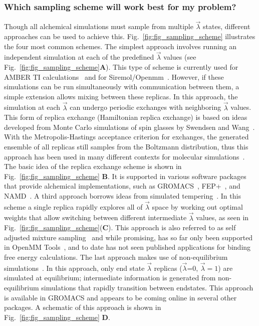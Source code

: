 \documentclass[9pt,bestpractices]{livecoms}
\begin{document}
\subsubsection{Which sampling scheme will work best for my problem?}
\label{sec:sampling_schemes}
Though all alchemical simulations must sample from multiple $\vec{\lambda}$ states, different approaches can be used to achieve this. Fig.~\ref{fig:fig_sampling_scheme} illustrates the four most common schemes. The simplest approach involves running an independent simulation at each of the predefined $\vec{\lambda}$ values (see Fig.~\ref{fig:fig_sampling_scheme}\textbf{A}). This type of scheme is currently used for AMBER TI calculations~\cite{song2019using} and for Siremol/Openmm~\cite{hedges2019biosimspace}. However, if these simulations can be run simultaneously with communication between them, a simple extension allows mixing between these replicas. In this approach, the simulation at each $\vec{\lambda}$ can undergo periodic exchanges with neighboring $\vec{\lambda}$ values. This form of replica exchange (Hamiltonian replica exchange) is based on ideas developed from Monte Carlo simulations of spin glasses by Swendsen and Wang~\cite{swendsen1986replica}. With the Metropolis-Hastings acceptance criterion for exchanges, the generated ensemble of all replicas still samples from the Boltzmann distribution, thus this approach has been used in many different contexts for molecular simulations~\cite{sugita2000multidimensionala,sugita1999replicaexchangea, woods2003developmenta, jiang2010free}. The basic idea of the replica exchange scheme is shown in Fig.~\ref{fig:fig_sampling_scheme} \textbf{B}. It is supported in various software packages that provide alchemical implementations, such as GROMACS~\cite{aldeghi2015accurate}, FEP+~\cite{wang2015accurate}, and NAMD~\cite{jiang2019computing}. A third approach borrows ideas from simulated tempering~\cite{marinari1992simulateda}. In this scheme a single replica rapidly explores all of $\vec{\lambda}$ space by working out optimal weights that allow switching between different intermediate $\vec{\lambda}$ values, as seen in Fig.~\ref{fig:fig_sampling_scheme}(\textbf{C}). This approach is also referred to as self adjusted mixture sampling~\cite{lyubartsev1992newa, li2007simulated, tan2017optimally} and while promising, has so far only been supported in OpenMM Tools~\cite{andrearizzi2019choderalab}, and to date has not seen published applications for binding free energy calculations. The last approach makes use of non-equilibrium simulations~\cite{aldeghi2018accurate}. In this approach, only end state $\vec{\lambda}$ replicas ($\vec{\lambda}$=0, $\vec{\lambda}=1$) are simulated at equilibrium; intermediate information is generated from non-equilibrium simulations that rapidly transition between endstates. This approach is available in GROMACS and appears to be coming online in several other packages. A schematic of this approach is shown in Fig.~\ref{fig:fig_sampling_scheme} \textbf{D}. 
\end{document}
